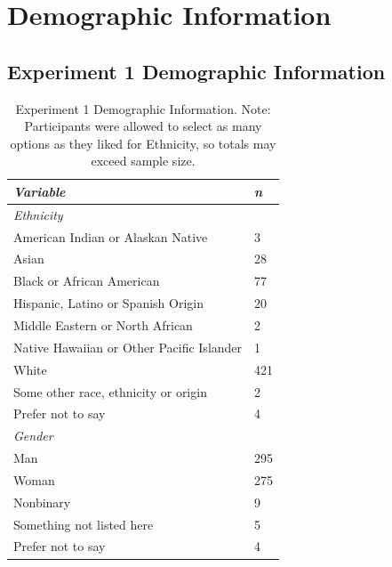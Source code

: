 \documentclass[12pt,]{article}
\begin{document}

\newpage
\section{Demographic Information}
\label{appendix:recruit}

\subsection{Experiment 1 Demographic Information}
\label{appendix:recruit_1}

\begin{table}[ht]
    \centering
    \begin{tabular}{l l}
        \toprule
        \emph{Variable} & \emph{n} \\
        \midrule
        \emph{Ethnicity} &  \\
        \hspace{1em} American Indian or Alaskan Native & 3 \\
        \hspace{1em} Asian & 28 \\
        \hspace{1em} Black or African American & 77 \\
        \hspace{1em} Hispanic, Latino or Spanish Origin & 20 \\
        \hspace{1em} Middle Eastern or North African& 2 \\
        \hspace{1em} Native Hawaiian or Other Pacific Islander & 1 \\ 
        \hspace{1em} White & 421 \\ 
        \hspace{1em} Some other race, ethnicity or origin & 2 \\ 
        \hspace{1em} Prefer not to say & 4 \\ 
      \emph{Gender} & \\ 
      \hspace{1em} Man & 295 \\
         \hspace{1em} Woman & 275 \\
         \hspace{1em} Nonbinary & 9 \\
         \hspace{1em} Something not listed here & 5 \\
         \hspace{1em} Prefer not to say & 4 \\
        \bottomrule
    \end{tabular}
    \caption{Experiment 1 Demographic Information. Note: Participants were allowed to select as many options as they liked for Ethnicity, so totals may exceed sample size. }
    \label{demo1}
\end{table}
\end{document}

